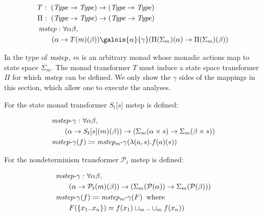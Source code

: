 \small\begin{align*}
&\hspace{0em} T  \mathbin{\colon}   (\itop{Type}   \rightarrow   \itop{Type})   \rightarrow   (\itop{Type}   \rightarrow   \itop{Type})  \\
&\hspace{0em}  \Pi   \mathbin{\colon}   (\itop{Type}   \rightarrow   \itop{Type})   \rightarrow   (\itop{Type}   \rightarrow   \itop{Type})  \\
&\hspace{0em}  \itop{mstep}   \mathbin{\colon}   \forall   \alpha   \beta ,  \\
&\hspace{2em} ( \alpha   \rightarrow  T(m)( \beta ))  \galois{\alpha}{\gamma}  ( \Pi ( \Sigma  _m )( \alpha )  \rightarrow   \Pi ( \Sigma  _m )( \beta ))
\end{align*}\normalsize

In the type of $ \operatorname{\mathit{mstep}} $, $m$ is an arbitrary monad whose monadic
actions map to state space $ \Sigma  _m $. The monad transformer $T$
must induce a state space transformer $ \Pi $ for which $ \operatorname{\mathit{mstep}} $
can be defined. We only show the $ \gamma $ sides of the mappings in
this section, which allow one to execute the analyses.

\par

For the state monad transformer $S _t  \lbrack s \rbrack $ mstep is
defined:

\small\begin{align*}
&\hspace{0em}  \operatorname{\mathit{mstep-\gamma}}   \mathbin{\colon}   \forall   \alpha   \beta ,  \\
&\hspace{2em} ( \alpha   \rightarrow  S _t  \lbrack s \rbrack (m)( \beta ))  \rightarrow  ( \Sigma  _m ( \alpha   \times  s)  \rightarrow   \Sigma  _m ( \beta   \times  s)) \\
&\hspace{0em}  \operatorname{\mathit{mstep-\gamma}} (f)  \coloneqq   \operatorname{\mathit{mstep_m-\gamma}} ( \lambda (a,s). f(a)(s))
\end{align*}\normalsize

For the nondeterminism transformer $ \mathcal{P}  _t $ mstep is defined:

\small\begin{align*}
&\hspace{0em}  \operatorname{\mathit{mstep-\gamma}}   \mathbin{\colon}   \forall   \alpha   \beta ,  \\
&\hspace{2em} ( \alpha   \rightarrow   \mathcal{P}  _t (m)( \beta ))  \rightarrow  ( \Sigma  _m ( \mathcal{P} ( \alpha ))  \rightarrow   \Sigma  _m ( \mathcal{P} ( \beta ))) \\
&\hspace{0em}  \operatorname{\mathit{mstep-\gamma}} (f)  \coloneqq   \operatorname{\mathit{mstep_m-\gamma}} (F)  \;\;\text{where}\;\;   \\
&\hspace{2em} F( \{ x _1  .. x _n  \} ) = f(x _1 )  \sqcup  _m  ..  \sqcup  _m  f(x _n ))
\end{align*}\normalsize

